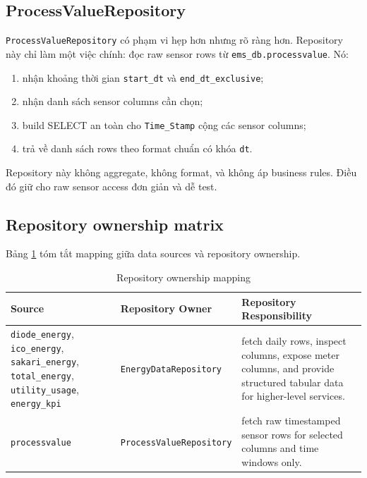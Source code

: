 \subsection{ProcessValueRepository}

\texttt{ProcessValueRepository} có phạm vi hẹp hơn nhưng rõ ràng hơn. Repository này chỉ làm một việc chính: đọc raw sensor rows từ \texttt{ems\_db.processvalue}. Nó:

\begin{enumerate}[label=-]
\item nhận khoảng thời gian \texttt{start\_dt} và \texttt{end\_dt\_exclusive};
\item nhận danh sách sensor columns cần chọn;
\item build SELECT an toàn cho \texttt{Time\_Stamp} cộng các sensor columns;
\item trả về danh sách rows theo format chuẩn có khóa \texttt{dt}.
\end{enumerate}

Repository này không aggregate, không format, và không áp business rules. Điều đó giữ cho raw sensor access đơn giản và dễ test.

\subsection{Repository ownership matrix}

Bảng \ref{tab:repository_mapping} tóm tắt mapping giữa data sources và repository ownership.

\begin{table}[htbp]
	\centering
	\renewcommand{\arraystretch}{1.3}
	\caption{Repository ownership mapping}
	\label{tab:repository_mapping}
	\begin{tabularx}{\linewidth}{|>{\RaggedRight\arraybackslash}p{3.0cm}|>{\RaggedRight\arraybackslash}p{3.3cm}|>{\RaggedRight\arraybackslash}X|}
		\hline
		\textbf{Source} & \textbf{Repository Owner} & \textbf{Repository Responsibility} \\ \hline
		\texttt{diode\_energy}, \texttt{ico\_energy}, \texttt{sakari\_energy}, \texttt{total\_energy}, \texttt{utility\_usage}, \texttt{energy\_kpi} & \texttt{EnergyDataRepository} & fetch daily rows, inspect columns, expose meter columns, and provide structured tabular data for higher-level services. \\ \hline
		\texttt{processvalue} & \texttt{ProcessValueRepository} & fetch raw timestamped sensor rows for selected columns and time windows only. \\ \hline
	\end{tabularx}
\end{table}

